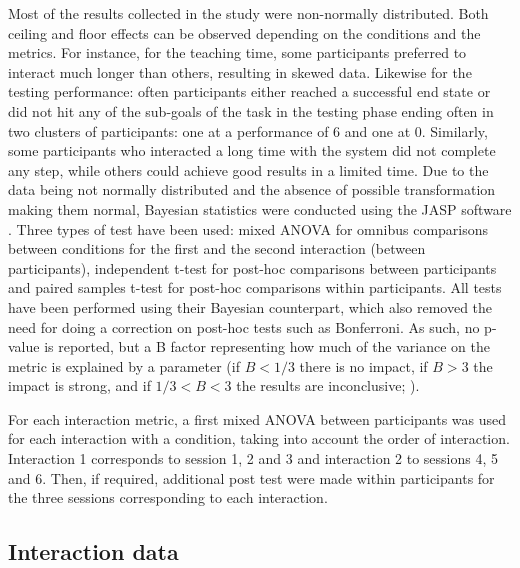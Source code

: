 Most of the results collected in the study were non-normally distributed. Both ceiling and floor effects can be observed depending on the conditions and the metrics. For instance, for the teaching time, some participants preferred to interact much longer than others, resulting in skewed data. Likewise for the testing performance: often participants either reached a successful end state or did not hit any of the sub-goals of the task in the testing phase ending often in two clusters of participants: one at a performance of 6 and one at 0.  Similarly, some participants who interacted a long time with the system did not complete any step, while others could achieve good results in a limited time. Due to the data being not normally distributed and the absence of possible transformation making them normal, Bayesian statistics were conducted using the JASP software \citep{jasp2018}. Three types of test have been used: mixed ANOVA for omnibus comparisons between conditions for the first and the second interaction (between participants), independent t-test for post-hoc comparisons between participants and paired samples t-test for post-hoc comparisons within participants. All tests have been performed using their Bayesian counterpart, which also removed the need for doing a correction on post-hoc tests such as Bonferroni. As such, no p-value is reported, but a B factor representing how much of the variance on the metric is explained by a parameter (if $B < 1/3$ there is no impact, if $B > 3$ the impact is strong, and if $1/3<B<3$ the results are inconclusive; \citealt{jeffreys1998theory,dienes2011bayesian}).

For each interaction metric, a first mixed ANOVA between participants was used for each interaction with a condition, taking into account the order of interaction. Interaction 1 corresponds to session 1, 2 and 3 and interaction 2 to sessions 4, 5 and 6. Then, if required, additional post test were made within participants for the three sessions corresponding to each interaction.



\subsection{Interaction data}

